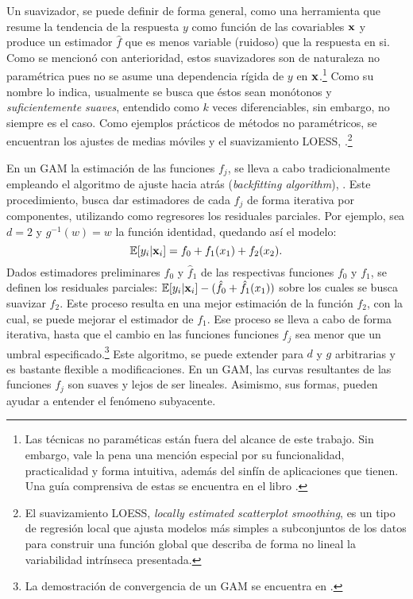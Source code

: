 \documentclass[../Main/Main.tex]{subfiles}
\begin{document}
Un suavizador, se puede definir de forma general, como una herramienta que resume la tendencia de la respuesta $y$ como función de las covariables $\mathbf{x}$ y produce un estimador $\hat{f}$ que es menos variable (ruidoso) que la respuesta en si. Como se mencionó con anterioridad, estos suavizadores son de naturaleza no paramétrica pues no se asume una dependencia rígida de $y$ en $\mathbf{x}$.\footnote{Las técnicas no paraméticas están fuera del alcance de este trabajo. Sin embargo, vale la pena una mención especial por su funcionalidad, practicalidad y forma intuitiva, además del sinfín de aplicaciones que tienen. Una guía comprensiva de estas se encuentra en el libro \citet{wasserman2007all}.} Como su nombre lo indica, usualmente se busca que éstos sean monótonos y \textit{suficientemente suaves}, entendido como $k$ veces diferenciables, sin embargo, no siempre es el caso. Como ejemplos prácticos de métodos no paramétricos, se encuentran los ajustes de medias móviles y el suavizamiento LOESS, \autocite{cleveland1988locally}.\footnote{El suavizamiento LOESS, \textit{locally estimated scatterplot smoothing}, es un tipo de regresión local que ajusta modelos más simples a subconjuntos de los datos para construir una función global que describa de forma no lineal la variabilidad intrínseca presentada.} 

En un GAM la estimación de las funciones $f_j$, se lleva a cabo tradicionalmente empleando el algoritmo de ajuste hacia atrás (\textit{backfitting algorithm}), \citet{hastie1986generalized}. Este procedimiento, busca dar estimadores de cada $f_j$ de forma iterativa por componentes, utilizando como regresores los residuales parciales. Por ejemplo, sea $d = 2$ y $g^{-1}(w) = w$ la función identidad, quedando así el modelo:
$$\mathbb{E}[y_i|\mathbf{x}_i] = f_0 + f_1(x_1) + f_2(x_2).$$
Dados estimadores preliminares $\hat{f}_0$ y $\hat{f}_1$ de las respectivas funciones $f_0$ y $f_1$, se definen los residuales parciales: $\mathbb{E}[y_i|\mathbf{x}_i] - (\hat{f}_0 + \hat{f}_1(x_1))$ sobre los cuales se busca suavizar $f_2$. Este proceso resulta en una mejor estimación de la función $f_2$, con la cual, se puede mejorar el estimador de $f_1$. Ese proceso se lleva a cabo de forma iterativa, hasta que el cambio en las funciones funciones $f_j$  sea menor que un umbral especificado.\footnote{La demostración de convergencia de un GAM se encuentra en \citet{stone1985additive}.} Este algoritmo, se puede extender para $d$ y $g$ arbitrarias y es bastante flexible a modificaciones. En un GAM, las curvas resultantes de las funciones $f_j$ son suaves y lejos de ser lineales. Asimismo, sus formas, pueden ayudar a entender el fenómeno subyacente. 
\end{document}
